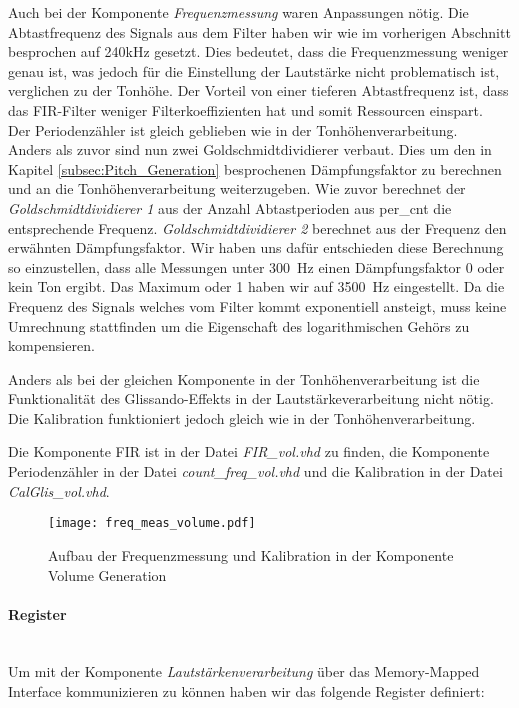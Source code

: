Auch bei der Komponente \textit{Frequenzmessung} waren Anpassungen nötig. 
Die Abtastfrequenz des Signals aus dem Filter haben wir wie im vorherigen Abschnitt besprochen auf 240kHz gesetzt. Dies bedeutet, dass die Frequenzmessung weniger genau ist, was jedoch für die Einstellung der Lautstärke nicht problematisch ist, verglichen zu der Tonhöhe. Der Vorteil von einer tieferen Abtastfrequenz ist, dass das FIR-Filter weniger Filterkoeffizienten hat und somit Ressourcen einspart.\\
Der Periodenzähler ist gleich geblieben wie in der Tonhöhenverarbeitung.\\
Anders als zuvor sind nun zwei Goldschmidtdividierer verbaut. Dies um den in Kapitel \ref{subsec:Pitch_Generation} besprochenen Dämpfungsfaktor zu berechnen und an die Tonhöhenverarbeitung weiterzugeben. Wie zuvor berechnet der \textit{Goldschmidtdividierer 1} aus der Anzahl Abtastperioden aus per\_cnt die entsprechende Frequenz. \textit{Goldschmidtdividierer 2} berechnet aus der Frequenz den erwähnten Dämpfungsfaktor. Wir haben uns dafür entschieden diese Berechnung so einzustellen, dass alle Messungen unter \SI{300}{Hz} einen Dämpfungsfaktor 0 oder kein Ton ergibt. Das Maximum oder 1 haben wir auf \SI{3500}{Hz} eingestellt. Da die Frequenz des Signals welches vom Filter kommt exponentiell ansteigt, muss keine Umrechnung stattfinden um die Eigenschaft des logarithmischen Gehörs zu kompensieren.

Anders als bei der gleichen Komponente in der Tonhöhenverarbeitung ist die Funktionalität des Glissando-Effekts in der Lautstärkeverarbeitung nicht nötig. Die Kalibration funktioniert jedoch gleich wie in der Tonhöhenverarbeitung.

Die Komponente FIR ist in der Datei \textit{FIR\_vol.vhd} zu finden, die Komponente Periodenzähler in der Datei \textit{count\_freq\_vol.vhd} und die Kalibration in der Datei \textit{CalGlis\_vol.vhd}.

\begin{figure}[h!]
	\centering
	\texttt{[image: freq\_meas\_volume.pdf]}
	\caption{Aufbau der Frequenzmessung und Kalibration in der Komponente Volume Generation} 
	\label{img:freq_meas_volume}
\end{figure}  

\newpage

\paragraph{Register}\mbox{}\\
Um mit der Komponente \textit{Lautstärkenverarbeitung} über das Memory-Mapped Interface kommunizieren zu können haben wir das folgende Register definiert:


